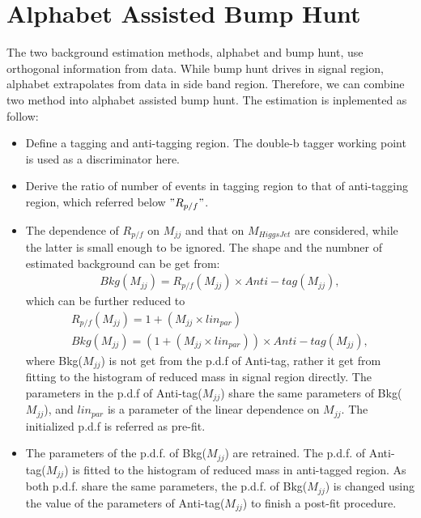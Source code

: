 \clearpage
\section{Alphabet Assisted Bump Hunt}
The two background estimation methods, alphabet and bump hunt, use orthogonal information from data.
While bump hunt drives in signal region, alphabet extrapolates from data in side band region. 
Therefore, we can combine two method into alphabet assisted bump hunt. The estimation is inplemented as follow:
\begin{itemize}
\item Define a tagging and anti-tagging region. The double-b tagger working point is used as a discriminator here.
\item Derive the ratio of number of events in tagging region to that of anti-tagging region, which referred below $" R_{p/f} "$.
\item The dependence of $R_{p/f}$ on $M_{jj}$ and that on $M_{Higgs Jet}$ are considered, while the latter is small enough to be ignored. The shape and the numbner of estimated background can be get from:
\begin{equation} \label{eq3}
\begin{split}
Bkg(M_{jj})= R_{p/f}(M_{jj}) \times Anti-tag(M_{jj}), 
\end{split}
\end{equation}
which can be further reduced to 
\begin{equation} \label{eq4}
\begin{split}
R_{p/f}(M_{jj})= 1+(M_{jj} \times lin_{par}) \\
Bkg(M_{jj})= (1+(M_{jj} \times lin_{par})) \times Anti-tag(M_{jj}),
\end{split}
\end{equation}
where Bkg($M_{jj}$) is not get from the p.d.f of Anti-tag, rather it get from fitting to the histogram of reduced mass in signal region directly.
The parameters in the p.d.f of Anti-tag($M_{jj}$) share the same parameters of Bkg($M_{jj}$), and $lin_{par}$ is a parameter of the linear dependence on $M_{jj}$. The initialized p.d.f is referred as pre-fit.
\item  The parameters of the p.d.f. of Bkg($M_{jj}$) are retrained. The p.d.f. of Anti-tag($M_{jj}$) is fitted to the histogram of reduced mass in anti-tagged region. As both p.d.f. share the same parameters, the p.d.f. of Bkg($M_{jj}$) is changed using the value of the parameters of Anti-tag($M_{jj}$) to finish a post-fit procedure. 

\end{itemize}
